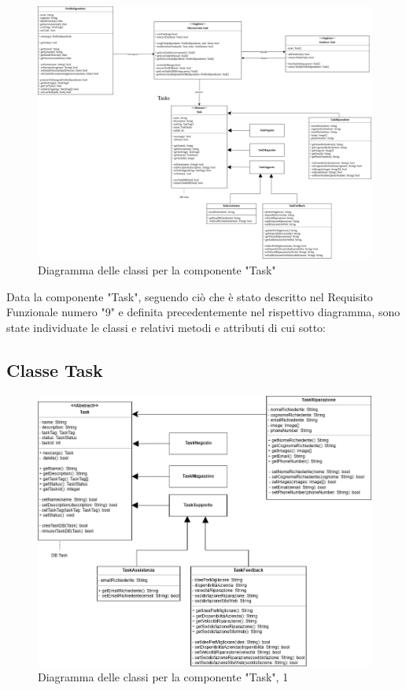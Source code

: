 \documentclass{report}
\begin{document}
\begin{figure}[H]
	\centering\includegraphics[width=1\textwidth]{images/Diagramma_delle_classi_task.png}
	Diagramma delle classi per la componente "Task"
\end{figure}
Data la componente "Task", seguendo ciò che è stato descritto nel Requisito Funzionale numero "9" e definita precedentemente nel rispettivo diagramma, sono state individuate le classi e relativi metodi e attributi di cui sotto:
\subsection*{Classe Task}
\begin{figure}[H]
	\centering\includegraphics[width=1\textwidth]{images/Diagramma_delle_classi_task1.png}
	Diagramma delle classi per la componente "Task", 1
\end{figure}
\end{document}
